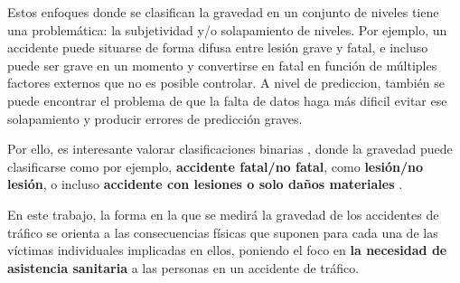 \documentclass{uathesis-es}
\begin{document}
Estos enfoques donde se clasifican la gravedad en un conjunto de niveles tiene una problemática: la subjetividad y/o solapamiento de niveles. Por ejemplo, un accidente puede situarse de forma difusa entre lesión grave y fatal, e incluso puede ser grave en un momento y convertirse en fatal en función de múltiples factores externos que no es posible controlar. A nivel de prediccion, también se puede encontrar el problema de que la falta de datos haga más dificil evitar ese solapamiento y producir errores de predicción graves.

Por ello, es interesante valorar clasificaciones binarias \cite{prati2017using, hosseinzadeh2021investigating}, donde la gravedad puede clasificarse como por ejemplo, \textbf{accidente fatal/no fatal}, como \textbf{lesión/no lesión}, o incluso \textbf{accidente con lesiones o solo daños materiales }\cite{zhang2022hybrid, ma2021analytic}.



En este trabajo, la forma en la que se medirá la gravedad de los accidentes de tráfico se orienta a las consecuencias físicas que suponen para cada una de las víctimas individuales implicadas en ellos, poniendo el foco en \textbf{la necesidad de asistencia sanitaria} a las personas en un accidente de tráfico.



\end{document}
